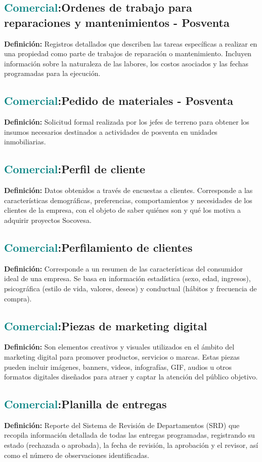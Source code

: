 \documentclass[12pt]{article}
\begin{document}
\subsection{\textcolor{teal}{Comercial}:{Ordenes de trabajo para reparaciones y mantenimientos - Posventa}}
\textbf{Definición:} Registros detallados que describen las tareas específicas a realizar en una propiedad como parte de trabajos de reparación o mantenimiento. Incluyen información sobre la naturaleza de las labores, los costos asociados y las fechas programadas para la ejecución.
\subsection{\textcolor{teal}{Comercial}:{Pedido de materiales - Posventa}}
\textbf{Definición:} Solicitud formal realizada por los jefes de terreno para obtener los insumos necesarios destinados a actividades de posventa en unidades inmobiliarias. 
\subsection{\textcolor{teal}{Comercial}:{Perfil de cliente}}
\textbf{Definición:} Datos obtenidos a través de encuestas a clientes. Corresponde a las características demográficas, preferencias, comportamientos y necesidades de los clientes de la empresa, con el objeto de saber quiénes son y qué los motiva a adquirir proyectos Socovesa.
\subsection{\textcolor{teal}{Comercial}:{Perfilamiento de clientes}}
\textbf{Definición:} Corresponde a un resumen de las características del consumidor ideal de una empresa. Se basa en información estadística (sexo, edad, ingresos), psicográfica (estilo de vida, valores, deseos) y conductual (hábitos y frecuencia de compra).
\subsection{\textcolor{teal}{Comercial}:{Piezas de marketing digital}}
\textbf{Definición:} Son elementos creativos y visuales utilizados en el ámbito del marketing digital para promover productos, servicios o marcas. Estas piezas pueden incluir imágenes, banners, videos, infografías, GIF, audios u otros formatos digitales diseñados para atraer y captar la atención del público objetivo.
\subsection{\textcolor{teal}{Comercial}:{Planilla de entregas}}
\textbf{Definición:} Reporte del Sistema de Revisión de Departamentos (SRD) que recopila información detallada de todas las entregas programadas, registrando su estado (rechazada o aprobada), la fecha de revisión, la aprobación y el revisor, así como el número de observaciones identificadas.
\end{document}
